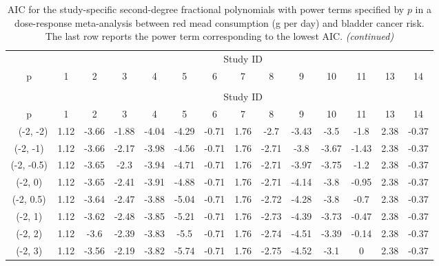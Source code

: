 \documentclass[11pt,a4paper,twoside,openany]{book}\usepackage{knitr}
\begin{document}
{\begin{knitrout}\footnotesize
{}\color{fgcolor}
\begin{landscape}
\begin{longtable}[t]{cccccccccccccc}
\caption{\label{tab:AIC_pi_red}AIC for the study-specific second-degree fractional polynomials with power terms specified by $p$ in a dose-response meta-analysis between red mead consumption (g per day) and bladder cancer risk. The last row reports the power term corresponding to the lowest AIC.}\\
\toprule
\multicolumn{ 1}{c}{ } & \multicolumn{13}{c}{Study ID} \\
\cmidrule(l{2pt}r{2pt}){2-14}
p & 1 & 2 & 3 & 4 & 5 & 6 & 7 & 8 & 9 & 10 & 11 & 13 & 14\\
\midrule
\endfirsthead
\caption[]{AIC for the study-specific second-degree fractional polynomials with power terms specified by $p$ in a dose-response meta-analysis between red mead consumption (g per day) and bladder cancer risk. The last row reports the power term corresponding to the lowest AIC. \textit{(continued)}}\\
\toprule
\multicolumn{ 1}{c}{ } & \multicolumn{13}{c}{Study ID} \\
\cmidrule(l{2pt}r{2pt}){2-14}
p & 1 & 2 & 3 & 4 & 5 & 6 & 7 & 8 & 9 & 10 & 11 & 13 & 14\\
\midrule
\endhead
\
\endfoot
\bottomrule
\endlastfoot
(-2, -2) & 1.12 & -3.66 & -1.88 & -4.04 & -4.29 & -0.71 & 1.76 & -2.7 & -3.43 & -3.5 & -1.8 & 2.38 & -0.37\\
(-2, -1) & 1.12 & -3.66 & -2.17 & -3.98 & -4.56 & -0.71 & 1.76 & -2.71 & -3.8 & -3.67 & -1.43 & 2.38 & -0.37\\
(-2, -0.5) & 1.12 & -3.65 & -2.3 & -3.94 & -4.71 & -0.71 & 1.76 & -2.71 & -3.97 & -3.75 & -1.2 & 2.38 & -0.37\\
(-2, 0) & 1.12 & -3.65 & -2.41 & -3.91 & -4.88 & -0.71 & 1.76 & -2.71 & -4.14 & -3.8 & -0.95 & 2.38 & -0.37\\
(-2, 0.5) & 1.12 & -3.64 & -2.47 & -3.88 & -5.04 & -0.71 & 1.76 & -2.72 & -4.28 & -3.8 & -0.7 & 2.38 & -0.37\\
\addlinespace
(-2, 1) & 1.12 & -3.62 & -2.48 & -3.85 & -5.21 & -0.71 & 1.76 & -2.73 & -4.39 & -3.73 & -0.47 & 2.38 & -0.37\\
(-2, 2) & 1.12 & -3.6 & -2.39 & -3.83 & -5.5 & -0.71 & 1.76 & -2.74 & -4.51 & -3.39 & -0.14 & 2.38 & -0.37\\
(-2, 3) & 1.12 & -3.56 & -2.19 & -3.82 & -5.74 & -0.71 & 1.76 & -2.75 & -4.52 & -3.1 & 0 & 2.38 & -0.37\\

\end{longtable}
\end{landscape}
\end{knitrout}}
\end{document}
